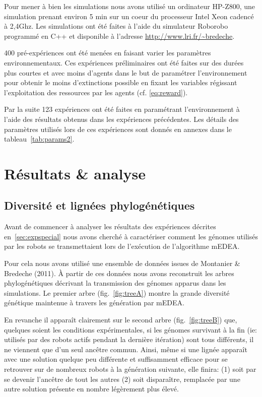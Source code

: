 \documentclass[a4paper,10pt]{report}
\begin{document}
Pour mener à bien les simulations nous avons utilisé un ordinateur HP-Z800, une simulation prenant environ 5 min sur un coeur du processeur Intel Xeon cadencé à 2,4Ghz. Les simulations ont été faites à l'aide du simulateur Roborobo programmé en C++ et disponible à l'adresse \url{http://www.lri.fr/~bredeche}.

400 pré-expériences ont été menées en faisant varier les paramètres environnementaux. Ces expériences préliminaires ont été faites sur des durées plus courtes et avec moins d'agents dans le but de paramétrer l'environnement pour obtenir le moins d'extinctions possible en fixant les variables régissant l'exploitation des ressources par les agents (cf. \ref{eq:reward}).

Par la suite 123 expériences ont été faites en paramétrant l'environnement à l'aide des résultats obtenus dans les expériences précédentes. Les détails des paramètres utilisés lors de ces expériences sont donnés en annexes dans le tableau~\ref{tab:params2}.


\chapter{Résultats \& analyse }\label{ch:result}


\section{Diversité et lignées phylogénétiques}
\label{sec:res:trees}

Avant de commencer à analyser les résultats des expériences décrites en~\ref{sec:expspecial} nous avons cherché à caractériser comment les génomes utilisés par les robots se transmettaient lors de l'exécution de l'algorithme mEDEA. 


Pour cela nous avons utilisé une ensemble de données issues de Montanier \& Bredeche (2011). \`{A} partir de ces données nous avons reconstruit les arbres phylogénétiques décrivant la transmission des génomes apparus dans les simulations. Le premier arbre (fig.~\ref{fig:treeA}) montre la grande diversité génétique maintenue à travers les génération par mEDEA. 

En revanche il apparaît clairement sur le second arbre (fig.~\ref{fig:treeB}) que, quelques soient les conditions expérimentales, si les génomes survivant à la fin (ie: utilisés par des robots actifs pendant la dernière itération) sont tous différents, il ne viennent que d'un seul ancêtre commun. Ainsi, même si une lignée apparaît avec une solution quelque peu différente et suffisamment efficace pour se retrouver sur de nombreux robots à la génération suivante, elle finira: (1) soit par se devenir l'ancêtre de tout les autres (2) soit disparaître, remplacée par une autre solution présente en nombre légèrement plus élevé. 
\end{document}
